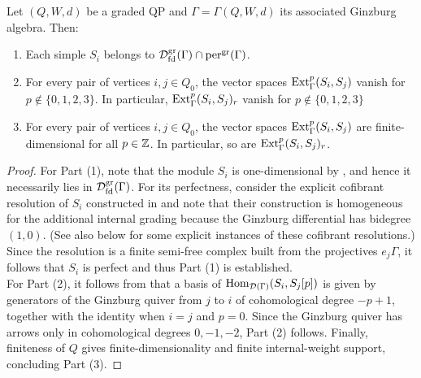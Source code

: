 \begin{proposition}\label{prop:ext-finite} Let $(Q,W,d)$ be a graded QP and $\Gamma=\Gamma(Q,W,d)$ its associated Ginzburg algebra. Then:
\begin{enumerate}
    \item Each simple $S_i$ belongs to $\mathcal D^{\mathrm{gr}}_{\mathrm{fd}}(\Gamma)\cap\operatorname{per}^{\mathrm{gr}}(\Gamma)$.
    
    \item For every pair of vertices $i,j\in Q_0$, the vector spaces $\operatorname{Ext}^{p}_{\Gamma}(S_i,S_j)$ vanish for $p\notin\{0,1,2,3\}$. In particular, $\operatorname{Ext}^{p}_{\Gamma}(S_i,S_j)_r$ vanish for $p\notin\{0,1,2,3\}$

    \item For every pair of vertices $i,j\in Q_0$, the vector spaces $\operatorname{Ext}^{p}_{\Gamma}(S_i,S_j)$ are finite-dimensional for all $p\in\mathbb Z$. In particular, so are $\operatorname{Ext}^{p}_{\Gamma}(S_i,S_j)_r$.
\end{enumerate}
\end{proposition}

\begin{proof}
For Part (1), note that the module $S_i$ is one-dimensional by , and hence it necessarily lies in $\mathcal D^{\mathrm{gr}}_{\mathrm{fd}}(\Gamma)$. For its perfectness, consider the explicit cofibrant resolution of $S_i$ constructed in \cite[Section~2.14]{KellerYang} and note that their construction is homogeneous for the additional internal grading because the Ginzburg differential has bidegree $(1,0)$. (See also  below for some explicit instances of these cofibrant resolutions.) Since the resolution is a finite semi-free complex built from the projectives $e_j\Gamma$, it follows that $S_i$ is perfect and thus Part (1) is established.\\

\noindent For Part (2), it follows from \cite[Lemma~2.15]{KellerYang} that a basis of $\operatorname{Hom}_{\mathcal D(\Gamma)}(S_i,S_j[p])$ is given by generators of the Ginzburg quiver from $j$ to $i$ of cohomological degree $-p+1$, together with the identity when $i=j$ and $p=0$.  Since the Ginzburg quiver has arrows only in cohomological degrees $0,-1,-2$, Part (2) follows. Finally, finiteness of $Q$ gives finite-dimensionality and finite internal-weight support, concluding Part (3).
\end{proof}

